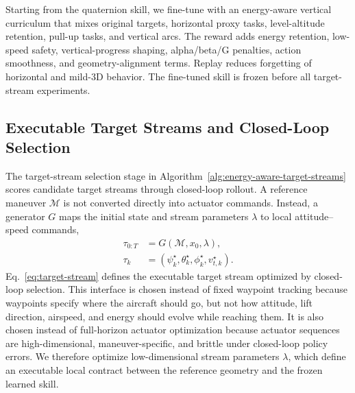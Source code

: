 \documentclass{article}
\begin{document}
Starting from the quaternion skill, we fine-tune with an energy-aware vertical curriculum that mixes original targets, horizontal proxy tasks, level-altitude retention, pull-up tasks, and vertical arcs.
The reward adds energy retention, low-speed safety, vertical-progress shaping, alpha/beta/G penalties, action smoothness, and geometry-alignment terms.
Replay reduces forgetting of horizontal and mild-3D behavior.
The fine-tuned skill is frozen before all target-stream experiments.

\subsection{Executable Target Streams and Closed-Loop Selection}
The target-stream selection stage in Algorithm~\ref{alg:energy-aware-target-streams} scores candidate target streams through closed-loop rollout.
A reference maneuver $\mathcal{M}$ is not converted directly into actuator commands.
Instead, a generator $G$ maps the initial state and stream parameters $\lambda$ to local attitude--speed commands,
\begin{equation}
\label{eq:target-stream}
\begin{aligned}
  \tau_{0:T} &= G(\mathcal{M},x_0,\lambda), \\
  \tau_k &= (\psi_k^\star,\theta_k^\star,\phi_k^\star,v_{t,k}^{\star}).
\end{aligned}
\end{equation}
Eq.~\eqref{eq:target-stream} defines the executable target stream optimized by closed-loop selection.
This interface is chosen instead of fixed waypoint tracking because waypoints specify where the aircraft should go, but not how attitude, lift direction, airspeed, and energy should evolve while reaching them.
It is also chosen instead of full-horizon actuator optimization because actuator sequences are high-dimensional, maneuver-specific, and brittle under closed-loop policy errors.
We therefore optimize low-dimensional stream parameters $\lambda$, which define an executable local contract between the reference geometry and the frozen learned skill.
\end{document}
